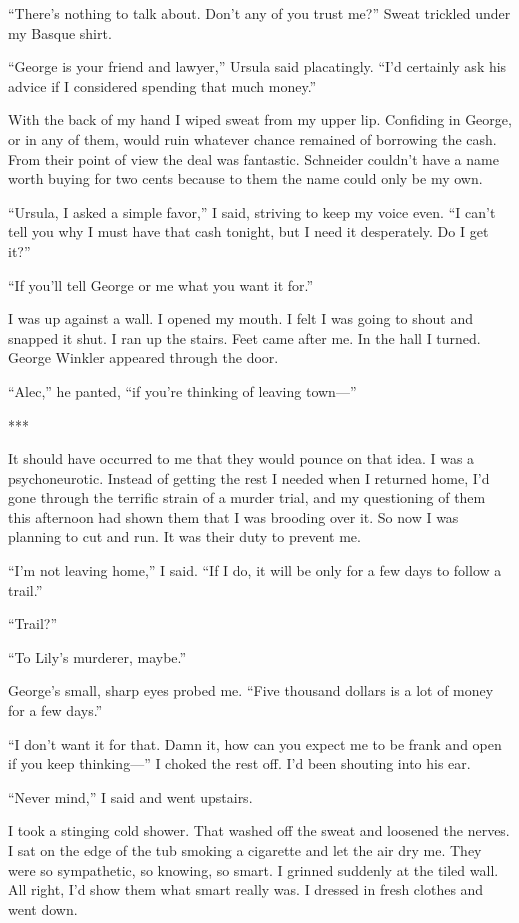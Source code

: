 {“There’s nothing to talk about. Don’t any of you trust me?” Sweat trickled under my Basque shirt.

“George is your friend and lawyer,” Ursula said placatingly. “I’d certainly ask his advice if I considered spending that much money.”

With the back of my hand I wiped sweat from my upper lip. Confiding in George, or in any of them, would ruin whatever chance remained of borrowing the cash. From their point of view the deal was fantastic. Schneider couldn’t have a name worth buying for two cents because to them the name could only be my own.

“Ursula, I asked a simple favor,” I said, striving to keep my voice even. “I can’t tell you why I must have that cash tonight, but I need it desperately. Do I get it?”

“If you’ll tell George or me what you want it for.”

I was up against a wall. I opened my mouth. I felt I was going to shout and snapped it shut. I ran up the stairs. Feet came after me. In the hall I turned. George Winkler appeared through the door.

“Alec,” he panted, “if you’re thinking of leaving town—”

***

It should have occurred to me that they would pounce on that idea. I was a psychoneurotic. Instead of getting the rest I needed when I returned home, I’d gone through the terrific strain of a murder trial, and my questioning of them this afternoon had shown them that I was brooding over it. So now I was planning to cut and run. It was their duty to prevent me.

“I’m not leaving home,” I said. “If I do, it will be only for a few days to follow a trail.”

“Trail?”

“To Lily’s murderer, maybe.”

George’s small, sharp eyes probed me. “Five thousand dollars is a lot of money for a few days.”

“I don’t want it for that. Damn it, how can you expect me to be frank and open if you keep thinking—” I choked the rest off. I’d been shouting into his ear.

“Never mind,” I said and went upstairs.

I took a stinging cold shower. That washed off the sweat and loosened the nerves. I sat on the edge of the tub smoking a cigarette and let the air dry me. They were so sympathetic, so knowing, so smart. I grinned suddenly at the tiled wall. All right, I’d show them what smart really was. I dressed in fresh clothes and went down.

}
